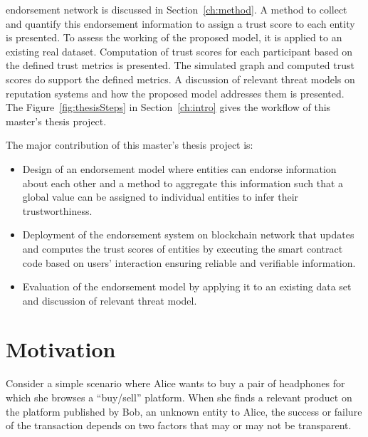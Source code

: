endorsement network is discussed in Section~\ref{ch:method}. A method to
collect and quantify this endorsement information to assign a trust score to
each entity is presented. To assess the working of the proposed model, it is
applied to an existing real dataset. Computation of trust scores for each
participant based on the defined trust metrics is presented. The simulated
graph and computed trust scores do support the defined metrics. A discussion of
relevant threat models on reputation systems and how the proposed model
addresses them is presented. The Figure~\ref{fig:thesisSteps} in
Section~\ref{ch:intro} gives the workflow of this master’s thesis project. \par
The major contribution of this master's thesis project is:
\begin{itemize}
	\item Design of an endorsement model where entities can endorse information
		about each other and a method to aggregate this information such that a
		global value can be assigned to individual entities to infer their
		trustworthiness.
	\item Deployment of the endorsement system on blockchain network that
		updates and computes the trust scores of entities by executing the
		smart contract code based on users' interaction ensuring reliable and
		verifiable information. 
	\item Evaluation of the endorsement model by applying it to an existing
		data set and discussion of relevant threat model.
\end{itemize}


 
\section{Motivation}
Consider a simple scenario where Alice wants to buy a pair of headphones for
which she browses a ``buy/sell'' platform. When she finds a relevant product on
the platform published by Bob, an unknown entity to Alice, the success or
failure of the transaction depends on two factors that may or may not be
transparent.
